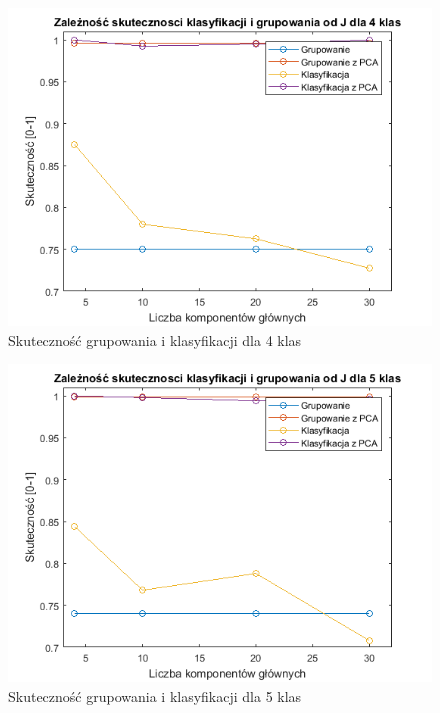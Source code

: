 \begin{figure}[H]
	\centering
	\includegraphics{img/acc_from_J_4classes.png}
	\caption{Skuteczność grupowania i klasyfikacji dla 4 klas}  
	\label{rys:acc_from_J_42classes} 
\end{figure}

\begin{figure}[H]
	\centering
	\includegraphics{img/acc_from_J_5classes.png}
	\caption{Skuteczność grupowania i klasyfikacji dla 5 klas}  
	\label{rys:acc_from_J_5classes} 
\end{figure}


